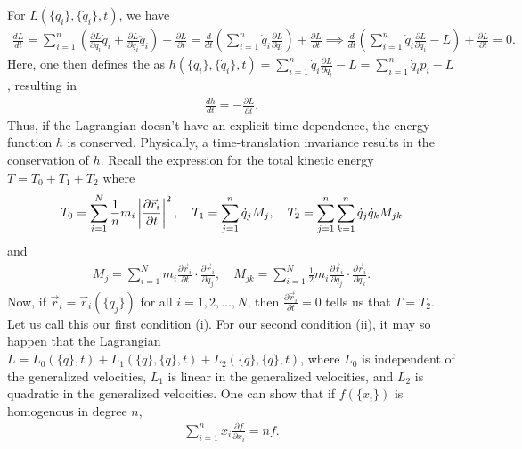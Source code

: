For $L(\{q_{i}\},\{\dot{q}_{i}\},t)$, we have
\begin{align}
    \frac{dL}{dt} = \sum_{i=1}^{n} \left(\frac{\partial L}{\partial q_{i}} \dot{q}_{i} + \frac{\partial L}{\partial \dot{q}_{i}} \ddot{q}_{i} \right) + \frac{\partial L}{\partial t} = \frac{d}{dt} \left( \sum_{i=1}^{n} \dot{q}_{i} \frac{\partial L}{\partial \dot{q}_{i}} \right) + \frac{\partial L}{\partial t} \implies \frac{d}{dt} \left( \sum_{i=1}^{n} \dot{q}_{i} \frac{\partial L}{\partial \dot{q}_{i}} - L\right) + \frac{\partial L}{\partial t} = 0.
\end{align}
Here, one then defines the  as $h(\{q_{i}\},\{\dot{q}_{i}\},t) = \sum_{i=1}^{n} \dot{q}_{i} \frac{\partial L}{\partial \dot{q}_{i}} - L = \sum_{i=1}^{n} \dot{q}_{i} p_{i} - L$, resulting in
\begin{align}
    \frac{dh}{dt} = -\frac{\partial L}{\partial t}.
\end{align}
Thus, if the Lagrangian doesn't have an explicit time dependence, the energy function $h$ is conserved. Physically, a time-translation invariance results in the conservation of $h$. Recall the expression for the total kinetic energy $T = T_{0} + T_{1} + T_{2}$ where
\begin{align}
    T_{0} = \sum_{i=1}^{N} \frac{1}{n}m_{i}\left| \frac{\partial \vec{r}_{i}}{\partial t} \right|^{2},\quad T_{1} = \sum_{j=1}^{n} \dot{q}_{j}M_{j}, \quad T_{2} = \sum_{j=1}^{n} \sum_{k=1}^{n} \dot{q}_{j} \dot{q}_{k} M_{jk}
\end{align}
and
\begin{align}
    M_{j} = \sum_{i=1}^{N} m_{i} \frac{\partial \vec{r}_{i}}{\partial t} \cdot \frac{\partial \vec{r}_{i}}{\partial q_{j}},\quad M_{jk} = \sum_{i=1}^{N} \frac{1}{2}m_{i} \frac{\partial \vec{r}_{i}}{\partial q_{j}} \cdot \frac{\partial \vec{r}_{i}}{\partial q_{k}}.
\end{align}
Now, if $\vec{r}_{i} = \vec{r}_{i}(\{q_{j}\})$ for all $i = 1,2,\ldots,N$, then $\frac{\partial \vec{r}_{i}}{\partial t} = 0$ tells us that $T = T_{2}$. Let us call this our first condition (i). For our second condition (ii), it may so happen that the Lagrangian $L = L_{0}(\{q\},t) + L_{1}(\{q\},\{\dot{q}\},t) + L_{2}(\{q\},\{\dot{q}\},t)$, where $L_{0}$ is independent of the generalized velocities, $L_{1}$ is linear in the generalized velocities, and $L_{2}$ is quadratic in the generalized velocities. One can show that if $f(\{x_{i}\})$ is homogenous in degree $n$, 
\begin{align}
    \sum_{i=1}^{n} x_{i} \frac{\partial f}{\partial x_{i}} = n f.
\end{align}
